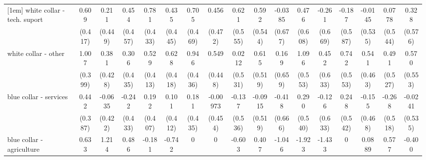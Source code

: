 {\begin{tabular}{l*{16}{c}}
[1em]
white collar - tech. suport&       0.609         &       0.211         &       0.454         &       0.781         &       0.435         &       0.705         &       0.456         &       0.621         &       0.592         &     -0.0385         &       0.476         &      -0.261         &      -0.187         &     -0.0145         &      0.0778         &       0.328         \\
                    &     (0.417)         &     (0.449)         &     (0.457)         &     (0.433)         &     (0.445)         &     (0.469)         &     (0.472)         &     (0.555)         &     (0.544)         &     (0.677)         &     (0.608)         &     (0.669)         &     (0.587)         &     (0.535)         &     (0.544)         &     (0.576)         \\
[1em]
white collar - other&       1.007\sym{*}  &       0.381         &       0.306         &       0.529         &       0.628         &       0.946\sym{*}  &       0.549         &      0.0212         &       0.615         &       0.169         &       1.096\sym{*}  &       0.452         &       0.742         &       0.541         &       0.491         &       0.570         \\
                    &     (0.399)         &     (0.428)         &     (0.435)         &     (0.413)         &     (0.418)         &     (0.436)         &     (0.448)         &     (0.531)         &     (0.519)         &     (0.659)         &     (0.553)         &     (0.633)         &     (0.553)         &     (0.463)         &     (0.527)         &     (0.553)         \\
[1em]
blue collar - services&       0.442         &     -0.0635         &      -0.242         &       0.192         &       0.101         &       0.181         &    -0.00973         &      -0.137         &     -0.0915         &      -0.418         &       0.290         &      -0.126         &       0.248         &      -0.155         &      -0.268         &     -0.0241         \\
                    &     (0.387)         &     (0.422)         &     (0.433)         &     (0.407)         &     (0.412)         &     (0.435)         &     (0.454)         &     (0.536)         &     (0.519)         &     (0.666)         &     (0.540)         &     (0.633)         &     (0.542)         &     (0.468)         &     (0.518)         &     (0.535)         \\
[1em]
blue collar - agriculture&       0.633         &       1.214         &       0.486         &      -0.181         &      -0.742         &           0         &           0         &      -0.603         &       0.407         &      -1.046         &      -1.923         &      -1.433         &           0         &      0.0889         &       0.577         &      -0.400         \\

\end{tabular}}
